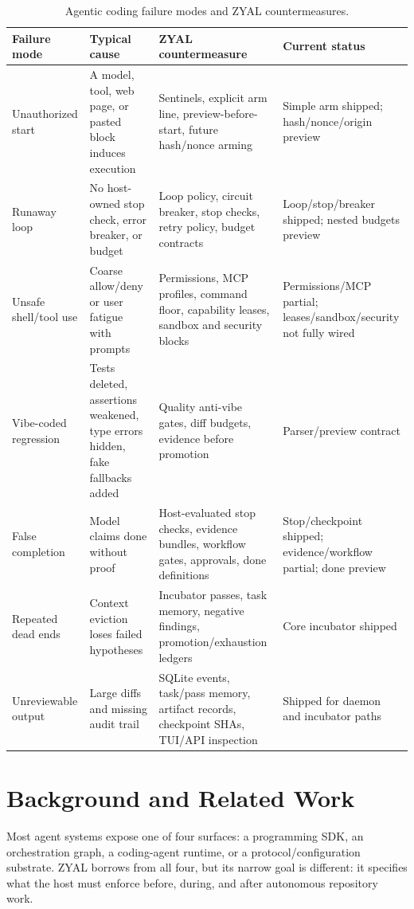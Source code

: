 \documentclass[conference]{IEEEtran}
\newcommand{\ZYAL}{ZYAL}
\begin{document}
\begin{table}[t]
\centering
\caption{Agentic coding failure modes and \ZYAL{} countermeasures.}
\label{tab:failures}
\footnotesize
\begin{tabularx}{\textwidth}{p{28mm}p{42mm}p{44mm}X}
\toprule
Failure mode & Typical cause & \ZYAL{} countermeasure & Current status \\
\midrule
Unauthorized start & A model, tool, web page, or pasted block induces execution & Sentinels, explicit arm line, preview-before-start, future hash/nonce arming & Simple arm shipped; hash/nonce/origin preview \\
\midrule
Runaway loop & No host-owned stop check, error breaker, or budget & Loop policy, circuit breaker, stop checks, retry policy, budget contracts & Loop/stop/breaker shipped; nested budgets preview \\
\midrule
Unsafe shell/tool use & Coarse allow/deny or user fatigue with prompts & Permissions, MCP profiles, command floor, capability leases, sandbox and security blocks & Permissions/MCP partial; leases/sandbox/security not fully wired \\
\midrule
Vibe-coded regression & Tests deleted, assertions weakened, type errors hidden, fake fallbacks added & Quality anti-vibe gates, diff budgets, evidence before promotion & Parser/preview contract \\
\midrule
False completion & Model claims done without proof & Host-evaluated stop checks, evidence bundles, workflow gates, approvals, done definitions & Stop/checkpoint shipped; evidence/workflow partial; done preview \\
\midrule
Repeated dead ends & Context eviction loses failed hypotheses & Incubator passes, task memory, negative findings, promotion/exhaustion ledgers & Core incubator shipped \\
\midrule
Unreviewable output & Large diffs and missing audit trail & SQLite events, task/pass memory, artifact records, checkpoint SHAs, TUI/API inspection & Shipped for daemon and incubator paths \\
\bottomrule
\end{tabularx}
\end{table}

\section{Background and Related Work}

Most agent systems expose one of four surfaces: a programming SDK, an orchestration graph, a coding-agent runtime, or a protocol/configuration substrate. \ZYAL{} borrows from all four, but its narrow goal is different: it specifies what the host must enforce before, during, and after autonomous repository work.
\end{document}
